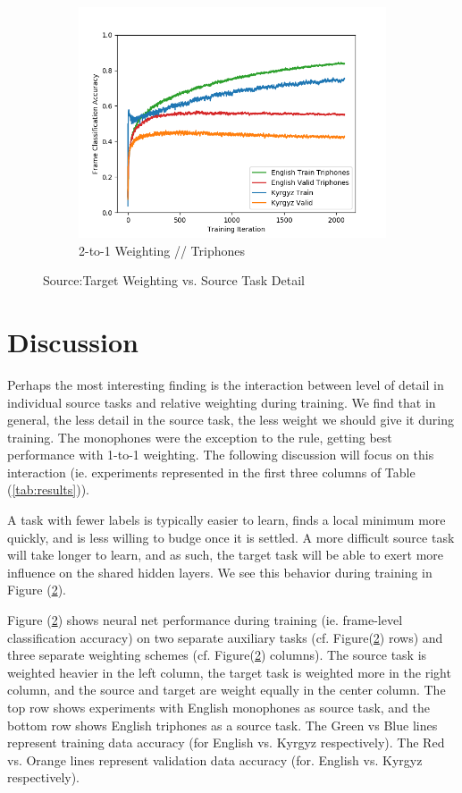 \documentclass[a4paper]{article}
\begin{document}
\begin{figure}[!htbp]
\begin{subfigure}{.33\textwidth}
  \includegraphics[width=1\textwidth,keepaspectratio]{figs-1/1-to-2-tri.png}
  \caption{2-to-1 Weighting // Triphones}
  \label{fig:sub2}
\end{subfigure}
\caption{Source:Target Weighting vs. Source Task Detail}
\label{fig:1-to-2}
\end{figure}



\section{Discussion}

Perhaps the most interesting finding is the interaction between level of detail in individual source tasks and relative weighting during training. We find that in general, the less detail in the source task, the less weight we should give it during training. The monophones were the exception to the rule, getting best performance with 1-to-1 weighting. The following discussion will focus on this interaction (ie. experiments represented in the first three columns of Table (\ref{tab:results})). 

A task with fewer labels is typically easier to learn, finds a local minimum more quickly, and is less willing to budge once it is settled. A more difficult source task will take longer to learn, and as such, the target task will be able to exert more influence on the shared hidden layers. We see this behavior during training in Figure (\ref{fig:1-to-2}).

Figure (\ref{fig:1-to-2}) shows neural net performance during training (ie. frame-level classification accuracy) on two separate auxiliary tasks (cf. Figure(\ref{fig:1-to-2}) rows) and three separate weighting schemes (cf. Figure(\ref{fig:1-to-2}) columns). The source task is weighted heavier in the left column, the target task is weighted more in the right column, and the source and target are weight equally in the center column. The top row shows experiments with English monophones as source task, and the bottom row shows English triphones as a source task. The Green vs Blue lines represent training data accuracy (for English vs. Kyrgyz respectively). The Red vs. Orange lines represent validation data accuracy (for. English vs. Kyrgyz respectively).
\end{document}
